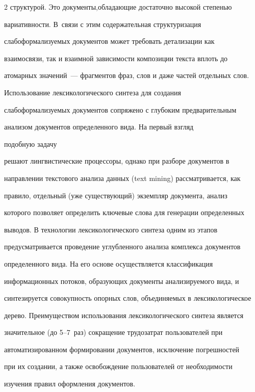 \begin{multicols}{2}
структурой. Это документы,\linebreak об\-ла\-да\-ющие достаточно высокой степенью 


ва\-риа\-тив\-ности. В~связи с этим содержательная структуризация 


слабоформализуемых документов может требовать детализации как 


взаимосвязи, так и взаимной зависимости композиции текста вплоть до 


атомарных значений~--- фрагментов фраз, слов и даже частей отдельных слов.


     


     Использование лексикологического синтеза для создания 


слабоформализуемых документов сопряжено с глубоким предварительным 


анализом документов определенного вида. На первый взгляд\linebreak


подобную задачу 


решают лингвистические про\-цессоры, однако при разборе документов в 


направлении текстового анализа данных (text mining) рассматривается, как 


правило, отдельный (уже су\-щест\-ву\-ющий) экземпляр документа, анализ 


которого позволяет определить ключевые слова для генерации определенных 


выводов. В технологии лексикологического синтеза одним из этапов 


преду\-смат\-ри\-ва\-ет\-ся проведение углубленного анализа комплекса документов 


определенного вида. На его основе осуществляется классификация 


информационных потоков, образующих документы анализируемого вида, и 


синтезируется совокупность опорных слов, объединяемых в лексикологическое 


дерево. Преимуществом использования лексикологического синтеза является 


значительное (до 5--7~раз) сокращение трудозатрат пользователей при 


автоматизированном формировании документов, исключение погрешностей 


при их создании, а также освобождение пользователей от необходимости 


изучения правил оформления документов.



\end{multicols}
